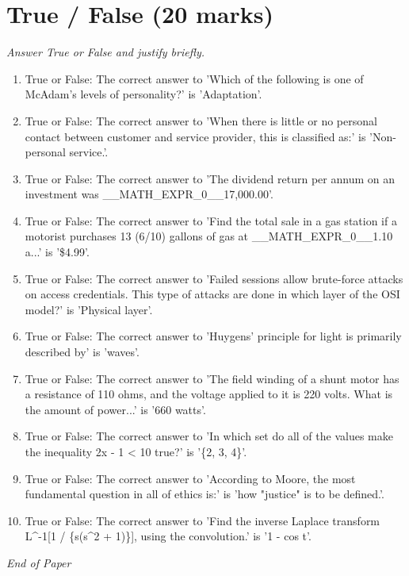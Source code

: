 \documentclass[12pt]{article}
\begin{document}
\section*{True / False (20 marks)}
\textit{Answer True or False and justify briefly.}
\begin{enumerate}[label=\arabic*.]
\item True or False: The correct answer to 'Which of the following is one of McAdam's levels of personality?' is 'Adaptation'.
\item True or False: The correct answer to 'When there is little or no personal contact between customer and service provider, this is classified as:' is 'Non-personal service.'.
\item True or False: The correct answer to 'The dividend return per annum on an investment was \_\_MATH\_EXPR\_0\_\_17,000.00'.
\item True or False: The correct answer to 'Find the total sale in a gas station if a motorist purchases 13 (6/10) gallons of gas at \_\_MATH\_EXPR\_0\_\_1.10 a...' is '\$4.99'.
\item True or False: The correct answer to 'Failed sessions allow brute-force attacks on access credentials. This type of attacks are done in which layer of the OSI model?' is 'Physical layer'.
\item True or False: The correct answer to 'Huygens' principle for light is primarily described by' is 'waves'.
\item True or False: The correct answer to 'The field winding of a shunt motor has a resistance of 110 ohms, and the voltage applied to it is 220 volts. What is the amount of power...' is '660 watts'.
\item True or False: The correct answer to 'In which set do all of the values make the inequality 2x - 1 < 10 true?' is '\{2, 3, 4\}'.
\item True or False: The correct answer to 'According to Moore, the most fundamental question in all of ethics is:' is 'how "justice" is to be defined.'.
\item True or False: The correct answer to 'Find the inverse Laplace transform L\^{}-1[1 / \{s(s\^{}2 + 1)\}], using the convolution.' is '1 - cos t'.
\end{enumerate}

\vfill
\noindent\textit{End of Paper}
\end{document}

